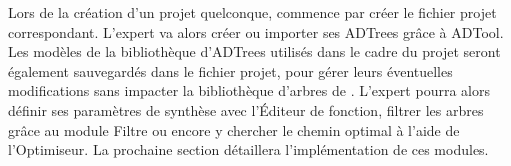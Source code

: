 Lors de la création d'un projet quelconque, \glasir{} commence par créer le fichier projet correspondant. L'expert va alors créer ou importer ses ADTrees grâce à ADTool. Les modèles de la bibliothèque d'ADTrees utilisés dans le cadre du projet seront également sauvegardés dans le fichier projet, pour gérer leurs éventuelles modifications sans impacter la bibliothèque d'arbres de \glasir{}. L'expert pourra alors définir ses paramètres de synthèse avec l’Éditeur de fonction, filtrer les arbres grâce au module Filtre ou encore y chercher le chemin optimal à l'aide de l'Optimiseur. La prochaine section détaillera l'implémentation de ces modules. 